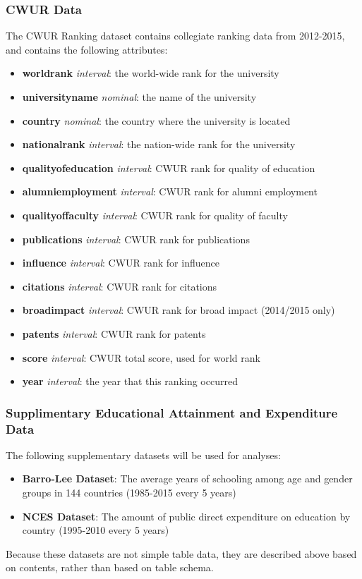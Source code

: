 \documentclass[12pt]{article}
\begin{document}
\subsubsection{CWUR Data}
The CWUR Ranking dataset contains collegiate ranking data from 2012-2015, and contains the following attributes:
\begin{itemize}
\item \textbf{world\textunderscore rank} \textit{interval}: the world-wide rank for the university
\item \textbf{university\textunderscore name} \textit{nominal}: the name of the university
\item \textbf{country} \textit{nominal}: the country where the university is located
\item \textbf{national\textunderscore rank} \textit{interval}: the nation-wide rank for the university
\item \textbf{quality\textunderscore of\textunderscore education} \textit{interval}: CWUR rank for quality of education
\item \textbf{alumni\textunderscore employment} \textit{interval}: CWUR rank for alumni employment
\item \textbf{quality\textunderscore of\textunderscore faculty} \textit{interval}: CWUR rank for quality of faculty
\item \textbf{publications} \textit{interval}: CWUR rank for publications
\item \textbf{influence} \textit{interval}: CWUR rank for influence
\item \textbf{citations} \textit{interval}: CWUR rank for citations
\item \textbf{broad\textunderscore impact} \textit{interval}: CWUR rank for broad impact (2014/2015 only)
\item \textbf{patents} \textit{interval}: CWUR rank for patents
\item \textbf{score} \textit{interval}: CWUR total score, used for world rank
\item \textbf{year} \textit{interval}: the year that this ranking occurred
\end{itemize}

\subsubsection{Supplimentary Educational Attainment and Expenditure Data}
The following supplementary datasets will be used for analyses:
\begin{itemize}
\item \textbf{Barro-Lee Dataset}: The average years of schooling among age and gender groups in 144 countries (1985-2015 every 5 years)
\item \textbf{NCES Dataset}: The amount of public direct expenditure on education by country (1995-2010 every 5 years)
\end{itemize}
Because these datasets are not simple table data, they are described above based on contents, rather than based on table schema.
\end{document}
